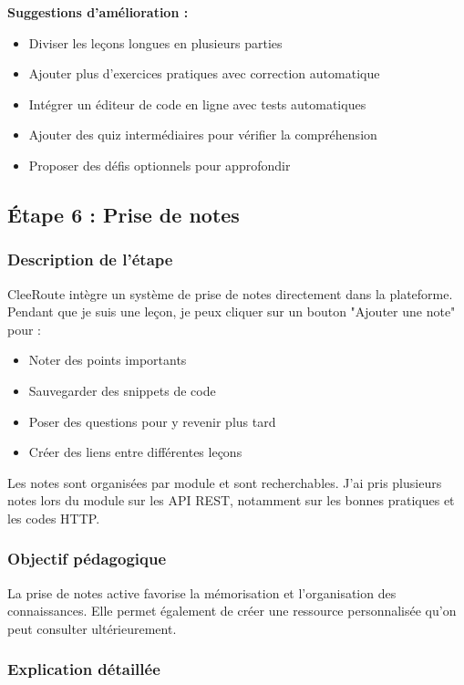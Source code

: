 \documentclass[12pt,a4paper]{article}
\begin{document}
\textbf{Suggestions d'amélioration :}
\begin{itemize}
    \item Diviser les leçons longues en plusieurs parties
    \item Ajouter plus d'exercices pratiques avec correction automatique
    \item Intégrer un éditeur de code en ligne avec tests automatiques
    \item Ajouter des quiz intermédiaires pour vérifier la compréhension
    \item Proposer des défis optionnels pour approfondir
\end{itemize}

\subsection{Étape 6 : Prise de notes}

\subsubsection{Description de l'étape}

CleeRoute intègre un système de prise de notes directement dans la plateforme. Pendant que je suis une leçon, je peux cliquer sur un bouton "Ajouter une note" pour :
\begin{itemize}
    \item Noter des points importants
    \item Sauvegarder des snippets de code
    \item Poser des questions pour y revenir plus tard
    \item Créer des liens entre différentes leçons
\end{itemize}

Les notes sont organisées par module et sont recherchables. J'ai pris plusieurs notes lors du module sur les API REST, notamment sur les bonnes pratiques et les codes HTTP.

\subsubsection{Objectif pédagogique}

La prise de notes active favorise la mémorisation et l'organisation des connaissances. Elle permet également de créer une ressource personnalisée qu'on peut consulter ultérieurement.

\subsubsection{Explication détaillée}
\end{document}
